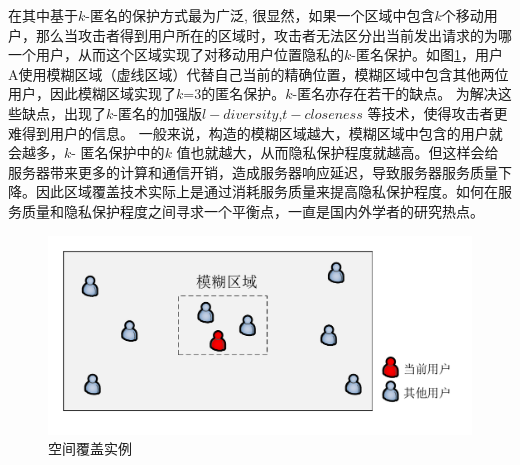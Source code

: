 在其中基于$k$-匿名的保护方式最为广泛\cite{Bamba}\cite{Mokbel}\cite{wang2010device}\cite{pan2012protecting}, 很显然，如果一个区域中包含$k$个移动用户，那么当攻击者得到用户所在的区域时，攻击者无法区分出当前发出请求的为哪一个用户，从而这个区域实现了对移动用户位置隐私的$k$-匿名保护。如图\ref{fig:cloaking_pdf}，用户A使用模糊区域（虚线区域）代替自己当前的精确位置，模糊区域中包含其他两位用户，因此模糊区域实现了$k$=3的匿名保护。$k$-匿名亦存在若干的缺点\cite{juncheng2014potential}。 为解决这些缺点，出现了$k$-匿名的加强版$l-diversity$\cite{machanavajjhala2007diversity},$t-closeness$\cite{li2007t} 等技术，使得攻击者更难得到用户的信息。 一般来说，构造的模糊区域越大，模糊区域中包含的用户就会越多，$k$- 匿名保护中的$k$ 值也就越大，从而隐私保护程度就越高。但这样会给服务器带来更多的计算和通信开销，造成服务器响应延迟，导致服务器服务质量下降。因此区域覆盖技术实际上是通过消耗服务质量来提高隐私保护程度。如何在服务质量和隐私保护程度之间寻求一个平衡点，一直是国内外学者的研究热点。
\begin{figure}[H]
\centering
\includegraphics[width=12cm]{fig/cloaking.pdf}
\caption{空间覆盖实例} %
\label{fig:cloaking_pdf}
\end{figure}

